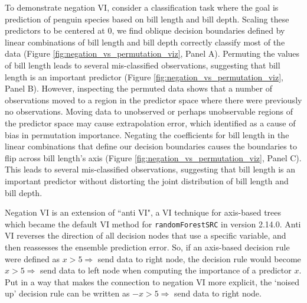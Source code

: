 \documentclass[12pt]{article}\usepackage[]{graphicx}\usepackage[]{xcolor}
\begin{document}
To demonstrate negation VI, consider a classification task where the goal is prediction of penguin species based on bill length and bill depth. Scaling these predictors to be centered at 0, we find oblique decision boundaries defined by linear combinations of bill length and bill depth correctly classify most of the data (Figure \ref{fig:negation_vs_permutation_viz}, Panel A). Permuting the values of bill length leads to several mis-classified observations, suggesting that bill length is an important predictor (Figure \ref{fig:negation_vs_permutation_viz}, Panel B). However, inspecting the permuted data shows that a number of observations moved to a region in the predictor space where there were previously no observations. Moving data to unobserved or perhaps unobservable regions of the predictor space may cause extrapolation error, which \citet{hooker2021unrestricted} identified as a cause of bias in permutation importance. Negating the coefficients for bill length in the linear combinations that define our decision boundaries causes the boundaries to flip across bill length's axis (Figure \ref{fig:negation_vs_permutation_viz}, Panel C). This leads to several mis-classified observations, suggesting that bill length is an important predictor without distorting the joint distribution of bill length and bill depth.

Negation VI is an extension of ``anti VI", a VI technique for axis-based trees which became the default VI method for \texttt{randomForestSRC} in version 2.14.0. Anti VI reverses the direction of all decision nodes that use a specific variable, and then reassesses the ensemble prediction error. So, if an axis-based decision rule were defined as $x > 5 \Rightarrow$ send data to right node, the decision rule would become $x > 5 \Rightarrow$ send data to left node when computing the importance of a predictor $x$. Put in a way that makes the connection to negation VI more explicit, the `noised up' decision rule can be written as $-x > 5 \Rightarrow$ send data to right node.
\end{document}
